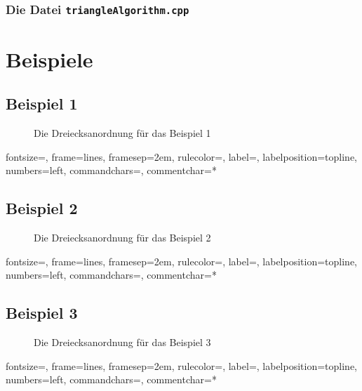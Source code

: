 \documentclass[a4paper, notitlepage, 12pt]{scrartcl}
\begin{document}
\subsubsection{Die Datei \texttt{triangleAlgorithm.cpp}}
\section{Beispiele}
\subsection{Beispiel 1}
\begin{figure}[H] 
	
	\caption{Die Dreiecksanordnung für das Beispiel 1}
\end{figure}
%
{fontsize=\footnotesize,
	frame=lines,  %
	framesep=2em, %
	rulecolor=\color{Gray},
	label=,
	labelposition=topline,
	numbers=left,
	commandchars=\|\(\), %
	commentchar=*        %
}
\subsection{Beispiel 2}
\begin{figure}[H] 
	
	\caption{Die Dreiecksanordnung für das Beispiel 2}
\end{figure}
%
{fontsize=\footnotesize,
	frame=lines,  %
	framesep=2em, %
	rulecolor=\color{Gray},
	label=,
	labelposition=topline,
	numbers=left,
	commandchars=\|\(\), %
	commentchar=*        %
}
\subsection{Beispiel 3}
\begin{figure}[H] 
	
	\caption{Die Dreiecksanordnung für das Beispiel 3}
\end{figure}
%
{fontsize=\footnotesize,
	frame=lines,  %
	framesep=2em, %
	rulecolor=\color{Gray},
	label=,
	labelposition=topline,
	numbers=left,
	commandchars=\|\(\), %
	commentchar=*        %
}
\end{document}
